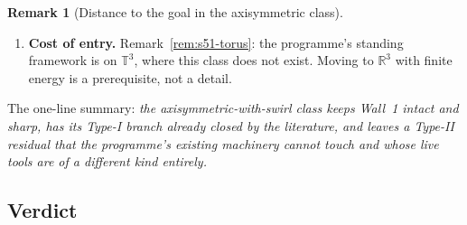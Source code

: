 \documentclass[11pt]{article}
\theoremstyle{definition}
\newtheorem{remark}[theorem]{Remark}
\theoremstyle{remark}
\newcommand{\R}{\mathbb{R}}
\newcommand{\T}{\mathbb{T}}
\begin{document}
\begin{remark}[Distance to the goal in the axisymmetric class]
\begin{enumerate}[label=\textup{(\arabic*)},leftmargin=2.4em]
    Calder\'on--Zygmund logarithm $\mathcal{L}$ of Wall~1, which
    Remark~\ref{rem:s51-verdict-log} shows also survives in this class, but a
    second one, in the spatial variable near the axis. \emph{The axisymmetric
    class does not have one fewer logarithm than the general problem; it has
    one more.} What it has instead is that this second logarithm is not known
    to be sharp: there is no counterexample showing $\Gamma\in L^\infty$
    cannot suffice, whereas Proposition~\ref{prop:s51-poloidal-sharp} shows
    the first one is sharp. That asymmetry --- a provably immovable
    obstruction traded for an open one --- is the only honest argument for
    working here, and it is an argument about prospects, not about progress.
  \item \textbf{Cost of entry.} Remark~\ref{rem:s51-torus}: the programme's
    standing framework is on $\T^3$, where this class does not exist. Moving
    to $\R^3$ with finite energy is a prerequisite, not a detail.
  \end{enumerate}
  The one-line summary: \emph{the axisymmetric-with-swirl class keeps Wall~1
  intact and sharp, has its Type-I branch already closed by the literature,
  and leaves a Type-II residual that the programme's existing machinery cannot
  touch and whose live tools are of a different kind entirely.}
\end{remark}

\subsection{Verdict}
\label{subsec:s51-verdict}
\end{document}
